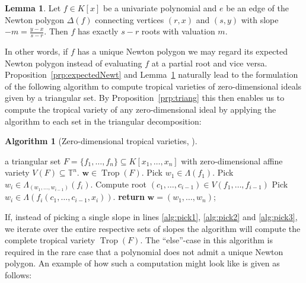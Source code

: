 \documentclass[
  paper=a4,
  titlepage,
  bibliography=totoc,
  listof=totoc,
  pagesize=pdftex
]{scrartcl}
\numberwithin{figure}{section}
\numberwithin{equation}{section}
\numberwithin{table}{section}
\newcommand*\setT{\mathds{T}}
\let\vec\mathbf
\DeclareMathOperator{\Trop}{Trop}
\theoremstyle{definition}
\newtheorem{lemma}[definition]{Lemma}
\newtheorem{algo}[definition]{Algorithm}
\numberwithin{definition}{section}
\begin{document}
\begin{lemma}
  Let $f \in K[x]$ be a univariate polynomial and $e$ be an edge of the Newton polygon
  $\Delta(f)$ connecting vertices $(r,x)$ and $(s, y)$ with slope $-m = \frac{y-x}{s-r}$.
  Then $f$ has exactly $s-r$ roots with valuation $m$.
  \label{lem:newtPolyRoots}
\end{lemma}

In other words, if $f$ has a unique Newton polygon we may regard its expected Newton
polygon instead of evaluating $f$ at a partial root and vice versa.
Proposition~\ref{prp:expectedNewt} and Lemma~\ref{lem:newtPolyRoots} naturally lead to the
formulation of the following algorithm to compute tropical varieties of zero-dimensional
ideals given by a triangular set. By Proposition~\ref{prp:triang} this then enables us to
compute the tropical variety of any zero-dimensional ideal by applying the algorithm to
each set in the triangular decomposition:

\begin{algo}[Zero-dimensional tropical varieties,
  {\cite[Algorithm~2.10]{tropPointsLinks}}] $ $
  \begin{algorithmic}[1]
    \Require a triangular set $F = \{f_1, \dots, f_n\} \subseteq K[x_1, \dots, x_n]$ with
    zero-dimensional affine variety $V(F) \subseteq \setT^n$.
    \Ensure $\vec w \in \Trop(F)$.
    \State Pick $w_1 \in \Lambda(f_1)$.
    \label{alg:pick1}
        \State Pick $w_i \in \Lambda_{(w_1, \dots, w_{i-1})}(f_i)$.
        \label{alg:pick2}
      \Else
        \State Compute root $(c_1, \dots, c_{i-1}) \in V(f_1, \dots, f_{i-1})$
        \State Pick $w_i \in \Lambda(f_i(c_1, \dots, c_{i-1}, x_i))$.
        \label{alg:pick3}
      \EndIf
    \EndFor
    \State \textbf{return} $\vec w = (w_1, \dots, w_n)$;
  \end{algorithmic}
  \label{alg:zeroDimTrop}
\end{algo}

If, instead of picking a single slope in lines \ref{alg:pick1}, \ref{alg:pick2} and
\ref{alg:pick3}, we iterate over the entire respective sets of slopes the algorithm will
compute the complete tropical variety $\Trop(F)$. The \enquote{else}-case in this
algorithm is required in the rare case that a polynomial does not admit a unique Newton
polygon. An example of how such a computation might look like is given as follows:
\end{document}
